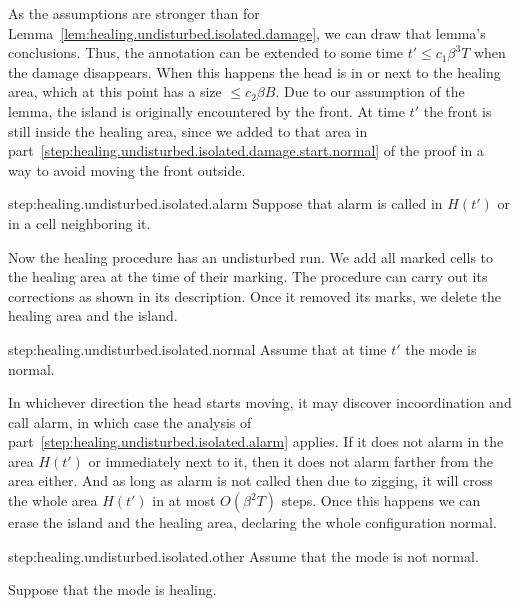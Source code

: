 \documentclass[12pt]{memoir}
\newcommand{\authnote}[3]
{\text{{ \textcolor{#3}{\( \langle\hspace{-0.2em}\langle \)\textsf{\footnotesize #1: #2}\( \rangle\hspace{-0.2em}\rangle \)}}}}
\newcommand{\authnote}[2]{}
\newcommand{\Pnote}[1]{{\authnote{Peter}{#1}{cyan}}}
\renewcommand{\le}{\leq}
\def\B{B}
\renewcommand{\H}{H}
\newcommand{\Tu}{T}
\begin{document}
\begin{Proof}
As the assumptions are stronger than for Lemma~\ref{lem:healing.undisturbed.isolated.damage},
we can draw that lemma's conclusions.
Thus, the annotation can be extended to some time \( t'\le c_{1}\beta^{3}\Tu \) 
when the damage disappears.
When this happens the head is in or next to the healing area, which
at this point has a size \( \le c_{2}\beta\B \).
Due to our assumption of the lemma, the island is originally encountered by
the front.
At time \( t' \) the front is still inside the healing area, since we
added to that area in part~\ref{step:healing.undisturbed.isolated.damage.start.normal}
of the proof in a way to avoid moving the front outside.

\begin{step+}{step:healing.undisturbed.isolated.alarm}
Suppose that alarm is called in \( \H(t') \) or in a cell neighboring it.
\end{step+}
\begin{prooofi}
Now the healing procedure has an undisturbed run.
We add all marked cells to the healing area at the time of their marking.
The procedure can carry out its corrections as shown in its description.
Once it removed its marks, we delete the healing area and the island.
\end{prooofi} %

\begin{step+}{step:healing.undisturbed.isolated.normal}
Assume that at time \( t' \) the mode is normal.
\end{step+}
\begin{prooofi}
In whichever direction the head starts moving, it may discover
incoordination and call alarm, in which case 
the analysis of part~\ref{step:healing.undisturbed.isolated.alarm} applies.
If it does not alarm in the area \( \H(t') \) or immediately next to it,
then it does not alarm farther from the area either. \Pnote{Elaborate!}
And as long as alarm is not called then due to zigging, it will cross the
whole area \( \H(t') \) in at most \( O(\beta^{2}\Tu) \) steps.
Once this happens we can erase the island and the healing area, declaring
the whole configuration normal. \Pnote{Elaborate!}
\end{prooofi} %

\begin{step+}{step:healing.undisturbed.isolated.other}
Assume that the mode is not normal.
\end{step+}
\begin{prooofi}
Suppose that the mode is healing.


\end{prooofi}
\end{Proof}
\end{document}
